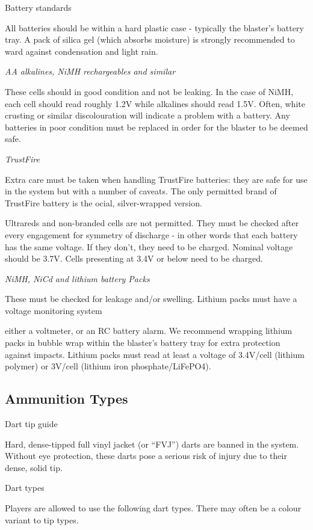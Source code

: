 Battery standards

All batteries should be within a hard plastic case - typically the blaster's battery tray. A pack of silica gel (which absorbs moisture) is strongly recommended to ward against condensation and light rain.

\textit{AA alkalines, NiMH rechargeables and similar}

These cells should in good condition and not be leaking. In the case of NiMH, each cell should read roughly 1.2V while alkalines should read 1.5V. Often, white crusting or similar discolouration will indicate a problem with a battery. Any batteries in poor condition must be replaced in order for the blaster to be deemed safe.

\textit{TrustFire}

Extra care must be taken when handling TrustFire batteries: they are safe for use in the system but with a number of caveats. The only permitted brand of TrustFire battery is the ocial, silver-wrapped version.

Ultrareds and non-branded cells are not permitted. They must be checked after every engagement for symmetry of discharge - in other words that each battery has the same voltage. If they don't, they need to be charged. Nominal voltage should be 3.7V. Cells presenting at 3.4V or below need to be charged.

\textit{NiMH, NiCd and lithium battery Packs}

These must be checked for leakage and/or swelling. Lithium packs must have a voltage monitoring system

either a voltmeter, or an RC battery alarm. We recommend wrapping lithium packs in bubble wrap within the blaster's battery tray for extra protection against impacts. Lithium packs must read at least a voltage of 3.4V/cell (lithium polymer) or 3V/cell (lithium iron phosphate/LiFePO4).

\subsection{Ammunition Types}

Dart tip guide

Hard, dense-tipped full vinyl jacket (or ``FVJ'') darts are banned in the system. Without eye protection, these darts pose a serious risk of injury due to their dense, solid tip.

Dart types

Players are allowed to use the following dart types. There may often be a colour variant to tip types.

